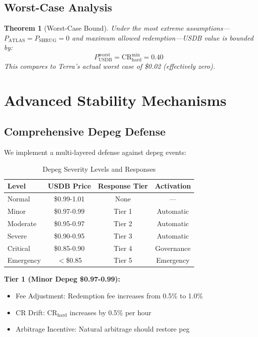 \documentclass[11pt,a4paper]{article}
\newtheorem{theorem}{Theorem}[section]
\begin{document}
\subsection{Worst-Case Analysis}

\begin{theorem}[Worst-Case Bound]
Under the most extreme assumptions---$P_{\text{ATLAS}} = P_{\text{SHRUG}} = 0$ and maximum allowed redemption---USDB value is bounded by:
\begin{equation}
P_{\text{USDB}}^{\text{worst}} = \text{CR}_{\text{hard}}^{\min} = 0.40
\end{equation}
This compares to Terra's actual worst case of \$0.02 (effectively zero).
\end{theorem}

\section{Advanced Stability Mechanisms}
\label{sec:advanced}

\subsection{Comprehensive Depeg Defense}

We implement a multi-layered defense against depeg events:

\begin{table}[H]
\centering
\caption{Depeg Severity Levels and Responses}
\begin{tabular}{@{}lccc@{}}
\toprule
\textbf{Level} & \textbf{USDB Price} & \textbf{Response Tier} & \textbf{Activation} \\ \midrule
Normal & \$0.99-1.01 & None & --- \\
Minor & \$0.97-0.99 & Tier 1 & Automatic \\
Moderate & \$0.95-0.97 & Tier 2 & Automatic \\
Severe & \$0.90-0.95 & Tier 3 & Automatic \\
Critical & \$0.85-0.90 & Tier 4 & Governance \\
Emergency & $<$\$0.85 & Tier 5 & Emergency \\ \bottomrule
\end{tabular}
\end{table}

\textbf{Tier 1 (Minor Depeg \$0.97-0.99):}
\begin{itemize}
    \item Fee Adjustment: Redemption fee increases from 0.5\% to 1.0\%
    \item CR Drift: $\text{CR}_{\text{hard}}$ increases by 0.5\% per hour
    \item Arbitrage Incentive: Natural arbitrage should restore peg
\end{itemize}
\end{document}
